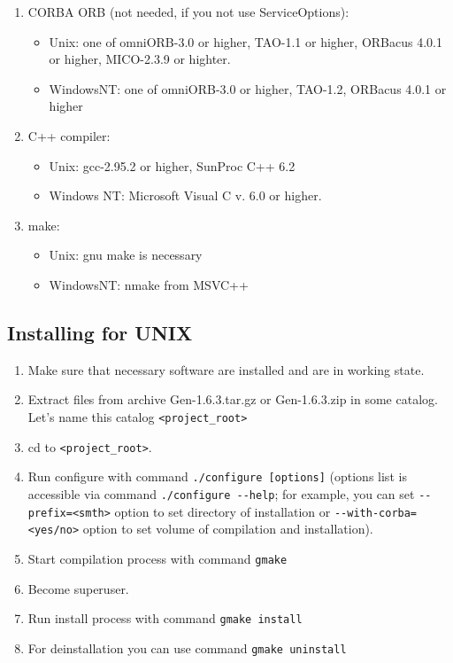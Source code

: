 \documentclass[10pt]{article}
\begin{document}
\begin{enumerate}
 \item CORBA ORB (not needed, if you not use ServiceOptions): 
  \begin{itemize} 
    \item Unix: one of omniORB-3.0 or higher, TAO-1.1 or higher, ORBacus 4.0.1 or higher, MICO-2.3.9 or highter.
    \item WindowsNT: one of omniORB-3.0 or higher, TAO-1.2, ORBacus 4.0.1 or higher 
  \end{itemize}
 \item C++ compiler: 
  \begin{itemize} 
   \item Unix:  gcc-2.95.2 or higher, SunProc C++ 6.2
   \item Windows NT: Microsoft Visual C v. 6.0 or higher.
  \end{itemize}
 \item make:
  \begin{itemize} 
   \item Unix:  gnu make is necessary
   \item WindowsNT: nmake from  MSVC++
  \end{itemize}
\end{enumerate}

\subsection{ Installing for UNIX}


\begin{enumerate}
 \item Make sure that necessary software are installed and are in working state.
 \item Extract files from archive Gen-1.6.3.tar.gz or Gen-1.6.3.zip in some catalog. Let's name
 this catalog \verb|<project_root>|
 \item cd to \verb|<project_root>|.
 \item Run configure with command \verb|./configure [options]| 
 (options list is accessible via command \verb|./configure --help|; 
 for example, you can set \verb|--prefix=<smth>| option to set directory of installation 
 or \verb|--with-corba=<yes/no>| option to set volume of compilation and installation).
 \item Start compilation process with command \verb|gmake|
 \item Become superuser. 
 \item Run install process with command \verb|gmake install| 
 \item For deinstallation you can use command \verb|gmake uninstall| 
\end{enumerate}
\end{document}
